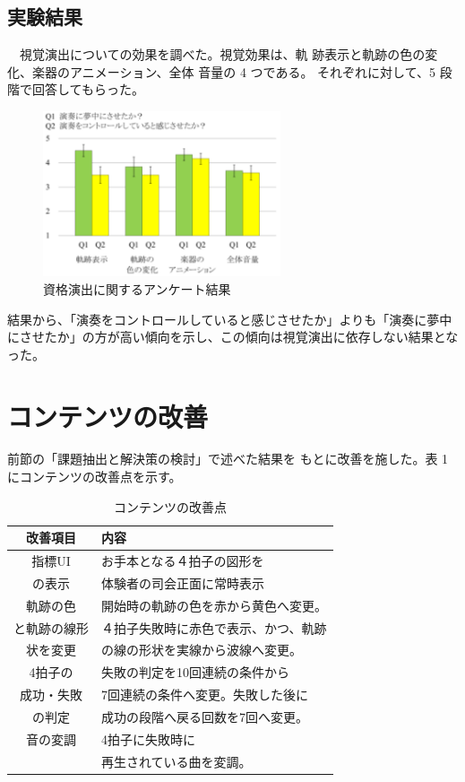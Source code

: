 \documentclass[uplatex]{jsarticle}   %
\begin{document}
\subsection{実験結果}
　視覚演出についての効果を調べた。視覚効果は、軌 跡表示と軌跡の色の変化、楽器のアニメーション、全体 音量の 4 つである。
 それぞれに対して、5 段階で回答してもらった。
\begin{figure}[H]
 \centering
 \includegraphics[clip,width=7cm]{yobi_1.png}
 \caption{資格演出に関するアンケート結果}
 \label{fig:hoge}
\end{figure}
結果から、「演奏をコントロールしていると感じさせたか」よりも「演奏に夢中にさせたか」の方が高い傾向を示し、この傾向は視覚演出に依存しない結果となった。

\section{コンテンツの改善}
前節の「課題抽出と解決策の検討」で述べた結果を もとに改善を施した。表 1 にコンテンツの改善点を示す。

\begin{table}[H]
 \centering
 \caption{コンテンツの改善点}\label{tab:fuga}
 \begin{tabular}{|c|l|}\hline
  改善項目 &  内容 \\
  \hline
  指標UI & お手本となる４拍子の図形を\\
  の表示& 体験者の司会正面に常時表示\\
  \hline
  軌跡の色 & 開始時の軌跡の色を赤から黄色へ変更。\\
  と軌跡の線形 & ４拍子失敗時に赤色で表示、かつ、軌跡\\ 
  状を変更&  の線の形状を実線から波線へ変更。\\
  \hline
  4拍子の& 失敗の判定を10回連続の条件から\\ 
  成功・失敗 & 7回連続の条件へ変更。失敗した後に \\
  の判定 & 成功の段階へ戻る回数を7回へ変更。\\
  \hline
  音の変調 & 4拍子に失敗時に\\
         & 再生されている曲を変調。\\
  \hline

  
 \end{tabular}
\end{table}
\end{document}
